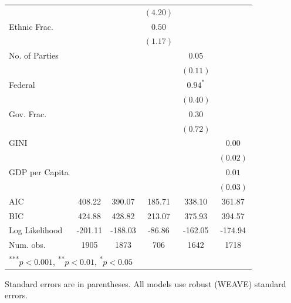 \documentclass[a4paper]{article}\usepackage{graphicx, color}
\begin{document}
\begin{table}
\begin{center}
\begin{tabular}{l c c c c c }
                       &               &               & $(4.20)$     &              &              \\
Ethnic Frac.           &               &               & $0.50$       &              &              \\
                       &               &               & $(1.17)$     &              &              \\
No. of Parties         &               &               &              & $0.05$       &              \\
                       &               &               &              & $(0.11)$     &              \\
Federal                &               &               &              & $0.94^{*}$   &              \\
                       &               &               &              & $(0.40)$     &              \\
Gov. Frac.             &               &               &              & $0.30$       &              \\
                       &               &               &              & $(0.72)$     &              \\
GINI                   &               &               &              &              & $0.00$       \\
                       &               &               &              &              & $(0.02)$     \\
GDP per Capita         &               &               &              &              & $0.01$       \\
                       &               &               &              &              & $(0.03)$     \\
\hline
AIC                    & 408.22        & 390.07        & 185.71       & 338.10       & 361.87       \\
BIC                    & 424.88        & 428.82        & 213.07       & 375.93       & 394.57       \\
Log Likelihood         & -201.11       & -188.03       & -86.86       & -162.05      & -174.94      \\
Num. obs.              & 1905          & 1873          & 706          & 1642         & 1718         \\
\hline
\multicolumn{6}{l}{\scriptsize{\textsuperscript{***}$p<0.001$, 
  \textsuperscript{**}$p<0.01$, 
  \textsuperscript{*}$p<0.05$}}
\end{tabular}



\end{center}
{\scriptsize{
    Standard errors are in parentheses. All models use robust (WEAVE) standard errors. \\
}}
\end{table}
\end{document}
